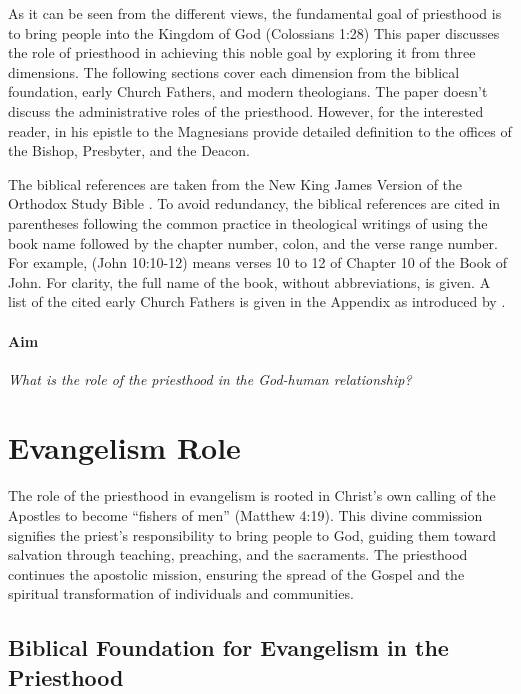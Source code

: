 \documentclass[12pt, doc]{apa7}   	%
\begin{document}
As it can be seen from the different views, the fundamental goal of priesthood is to bring people into the Kingdom of God (Colossians 1:28) This paper discusses the role of priesthood in achieving this noble goal by exploring it from three dimensions.  The following sections cover each dimension from the biblical foundation, early Church Fathers, and modern theologians.  The paper doesn't discuss the administrative roles of the priesthood.  However, for the interested reader, \citet{epistles_ignatius} in his epistle to the Magnesians provide detailed definition to the offices of the Bishop, Presbyter, and the Deacon.  

The biblical references are taken from the New King James Version of the Orthodox Study Bible \citep{nelson_nkjv}.  To avoid redundancy, the biblical references are cited in parentheses following the common practice in theological writings of using the book name followed by the chapter number, colon, and the verse range number.  For example, (John 10:10-12) means verses 10 to 12 of Chapter 10 of the Book of John.  For clarity, the full name of the book, without abbreviations, is given.  A list of the cited early Church Fathers is given in the Appendix as introduced by \citet{early_church_akin}.

\vskip 0.5cm
\paragraph{Aim}  \emph{What is the role of the priesthood in the God-human relationship?}



\section{Evangelism Role}\label{evangelism}
The role of the priesthood in evangelism is rooted in Christ’s own calling of the Apostles to become “fishers of men” (Matthew 4:19). This divine commission signifies the priest’s responsibility to bring people to God, guiding them toward salvation through teaching, preaching, and the sacraments. The priesthood continues the apostolic mission, ensuring the spread of the Gospel and the spiritual transformation of individuals and communities.

\subsection{Biblical Foundation for Evangelism in the Priesthood}
\end{document}
